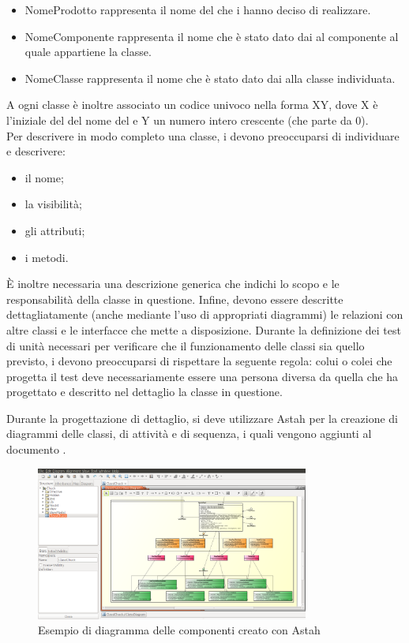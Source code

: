 					\begin{itemize}
						\item NomeProdotto rappresenta il nome del   che i  hanno deciso di realizzare.
						\item NomeComponente rappresenta il nome che è stato dato dai  al componente al quale appartiene la classe.
						\item NomeClasse rappresenta il nome che è stato dato dai  alla classe individuata.
					\end{itemize}
					A ogni classe è inoltre associato un codice univoco nella forma XY, dove X è l'iniziale del del nome del  e Y un numero intero crescente (che parte da 0).\\
					 \label{sec:DescrizioneClasse}
					Per descrivere in modo completo una classe, i  devono preoccuparsi di individuare e descrivere:
					\begin{itemize}
						\item il nome;
						\item la visibilità;
						\item gli attributi;
						\item i metodi.
					\end{itemize}
					È inoltre necessaria una descrizione generica che indichi lo scopo e le responsabilità della classe in questione. Infine, devono essere descritte dettagliatamente (anche mediante l'uso di appropriati diagrammi) le relazioni con altre classi e le interfacce che mette a disposizione.
					 \label{sec:TestUnita}
					Durante la definizione dei test di unità necessari per verificare che il funzionamento delle classi sia quello previsto, i  devono preoccuparsi di rispettare la seguente regola: colui o colei che progetta il test deve necessariamente essere una persona diversa da quella che ha progettato e descritto nel dettaglio la classe in questione.

				Durante la progettazione di dettaglio, si deve utilizzare Astah per la creazione di diagrammi delle classi, di attività e di sequenza, i quali vengono aggiunti al documento .
				\begin{figure}[H]
					\centering
					\includegraphics[width=0.8\textwidth]{NormeDiProgetto/Pics/ClassiAstah.png}
					\caption{Esempio di diagramma delle componenti creato con Astah}
				\end{figure}

